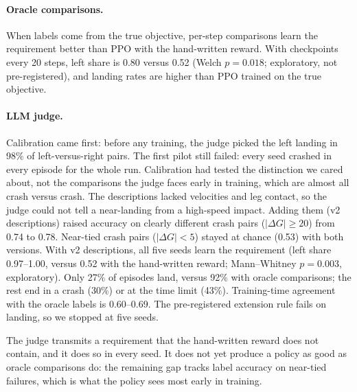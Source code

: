 \documentclass[11pt]{article}
\theoremstyle{remark}
\begin{document}
\begin{table}[h]
\centering
\caption{LunarLeft, last 10 updates, mean $\pm$ 95\% CI over seeds. Left share is the fraction of non-crash endings on the left half. The oracle rows were not pre-registered. The judge pilots were pre-registered with an extension rule (left share $\ge 0.70$ and landing $\ge 0.80$), which the v2 pilot fails on landing.}
\label{tab:left}
\small
{}
\end{table}

\paragraph{Oracle comparisons.} When labels come from the true objective, per-step comparisons learn the requirement better than PPO with the hand-written reward. With checkpoints every 20 steps, left share is 0.80 versus 0.52 (Welch $p=0.018$; exploratory, not pre-registered), and landing rates are higher than PPO trained on the true objective.

\paragraph{LLM judge.} Calibration came first: before any training, the judge picked the left landing in 98\% of left-versus-right pairs. The first pilot still failed: every seed crashed in every episode for the whole run. Calibration had tested the distinction we cared about, not the comparisons the judge faces early in training, which are almost all crash versus crash. The descriptions lacked velocities and leg contact, so the judge could not tell a near-landing from a high-speed impact. Adding them (v2 descriptions) raised accuracy on clearly different crash pairs ($|\Delta G|\ge 20$) from 0.74 to 0.78. Near-tied crash pairs ($|\Delta G|<5$) stayed at chance (0.53) with both versions. With v2 descriptions, all five seeds learn the requirement (left share 0.97--1.00, versus 0.52 with the hand-written reward; Mann--Whitney $p=0.003$, exploratory). Only 27\% of episodes land, versus 92\% with oracle comparisons; the rest end in a crash (30\%) or at the time limit (43\%). Training-time agreement with the oracle labels is 0.60--0.69. The pre-registered extension rule fails on landing, so we stopped at five seeds.

The judge transmits a requirement that the hand-written reward does not contain, and it does so in every seed. It does not yet produce a policy as good as oracle comparisons do: the remaining gap tracks label accuracy on near-tied failures, which is what the policy sees most early in training.
\end{document}

